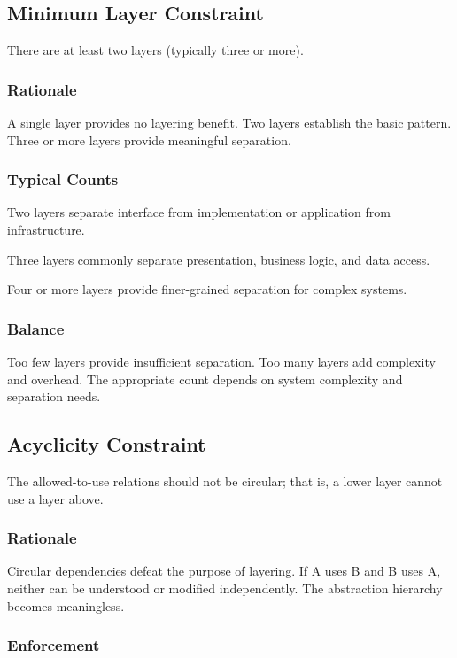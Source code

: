 \documentclass[11pt]{article}
\begin{document}
\subsection{Minimum Layer Constraint}

There are at least two layers (typically three or more).

\subsubsection{Rationale}

A single layer provides no layering benefit. Two layers establish the basic pattern. Three or more layers provide meaningful separation.

\subsubsection{Typical Counts}

Two layers separate interface from implementation or application from infrastructure.

Three layers commonly separate presentation, business logic, and data access.

Four or more layers provide finer-grained separation for complex systems.

\subsubsection{Balance}

Too few layers provide insufficient separation. Too many layers add complexity and overhead. The appropriate count depends on system complexity and separation needs.

\subsection{Acyclicity Constraint}

The allowed-to-use relations should not be circular; that is, a lower layer cannot use a layer above.

\subsubsection{Rationale}

Circular dependencies defeat the purpose of layering. If A uses B and B uses A, neither can be understood or modified independently. The abstraction hierarchy becomes meaningless.

\subsubsection{Enforcement}
\end{document}
